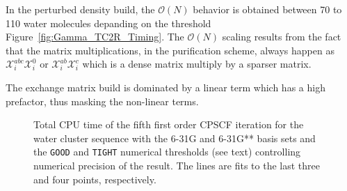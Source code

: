 \documentclass[prl,aps,letterpaper,twocolumn,showpacs,twocolumngrid,superbib]{revtex4}
\def\X{\mathcal{X}}
\begin{document}
In the perturbed density build, the $\mathcal{O}(N)$ behavior is obtained
between 70 to 110 water molecules depanding on the threshold 
Figure~\ref{fig:Gamma_TC2R_Timing}. The $\mathcal{O}(N)$ scaling results 
from the fact that the matrix multiplications, in the purification
scheme, always happen as $\X^{abc}_i\X^{0}_i$ or $\X^{ab}_i\X^{c}_i$
which is a dense matrix multiply by a sparser matrix.

The exchange matrix build is dominated by a linear term which has a high prefactor, thus
masking the non-linear terms.


\begin{figure}[t]
  \caption{\protect
    Total CPU time of the fifth first order CPSCF iteration for
    the water cluster sequence with the 6-31G and 6-31G** 
    basis sets and the {\tt GOOD} and {\tt TIGHT} 
    numerical thresholds (see text) controlling numerical
    precision of the result. The lines are fits to the 
    last three and four points, respectively.
  }\label{fig:Alpha_scaling}
\end{figure}
\end{document}
